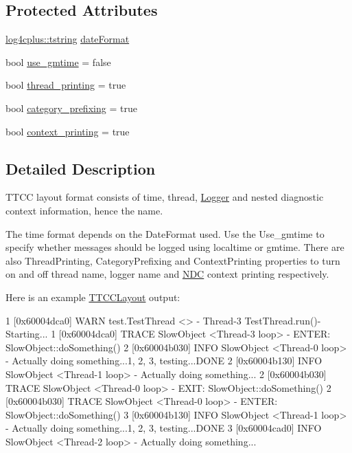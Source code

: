 \subsection*{Protected Attributes}
\begin{DoxyCompactItemize}
\item 
\hyperlink{namespacelog4cplus_a3c9287f6ebcddc50355e29d71152117b}{log4cplus\-::tstring} \hyperlink{classlog4cplus_1_1TTCCLayout_aed879aa3c7ccf97bda7ad55862d70cab}{date\-Format}
\item 
bool \hyperlink{classlog4cplus_1_1TTCCLayout_a58ef0436c87f4ce6887903ff48747190}{use\-\_\-gmtime} = false
\item 
bool \hyperlink{classlog4cplus_1_1TTCCLayout_a4aa56cdb7306c3fae1a2d4fcab796acf}{thread\-\_\-printing} = true
\item 
bool \hyperlink{classlog4cplus_1_1TTCCLayout_a8c599f48cbb004c16df075254b483205}{category\-\_\-prefixing} = true
\item 
bool \hyperlink{classlog4cplus_1_1TTCCLayout_ab4d7656df1d9688045231c93bb0e09fb}{context\-\_\-printing} = true
\end{DoxyCompactItemize}


\subsection{Detailed Description}
T\-T\-C\-C layout format consists of time, thread, \hyperlink{classlog4cplus_1_1Logger}{Logger} and nested diagnostic context information, hence the name.

The time format depends on the {\ttfamily Date\-Format} used. Use the {\ttfamily Use\-\_\-gmtime} to specify whether messages should be logged using {\ttfamily localtime} or {\ttfamily gmtime}. There are also {\ttfamily Thread\-Printing}, {\ttfamily Category\-Prefixing} and {\ttfamily Context\-Printing} properties to turn on and off thread name, logger name and \hyperlink{classlog4cplus_1_1NDC}{N\-D\-C} context printing respectively.

Here is an example \hyperlink{classlog4cplus_1_1TTCCLayout}{T\-T\-C\-C\-Layout} output\-:


\begin{DoxyCode}
1 [0x60004dca0] WARN test.TestThread <> - Thread-3 TestThread.run()- Starting...
1 [0x60004dca0] TRACE SlowObject <Thread-3 loop> - ENTER: SlowObject::doSomething()
2 [0x60004b030] INFO SlowObject <Thread-0 loop> - Actually doing something...1, 2, 3, testing...DONE
2 [0x60004b130] INFO SlowObject <Thread-1 loop> - Actually doing something...
2 [0x60004b030] TRACE SlowObject <Thread-0 loop> - EXIT:  SlowObject::doSomething()
2 [0x60004b030] TRACE SlowObject <Thread-0 loop> - ENTER: SlowObject::doSomething()
3 [0x60004b130] INFO SlowObject <Thread-1 loop> - Actually doing something...1, 2, 3, testing...DONE
3 [0x60004cad0] INFO SlowObject <Thread-2 loop> - Actually doing something...
\end{DoxyCode}


